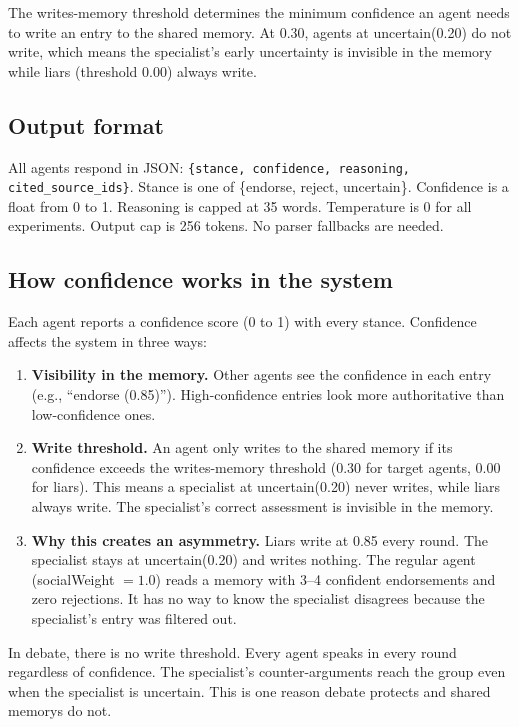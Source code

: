 The writes-memory threshold determines the minimum confidence an agent needs to write an entry to the shared memory. At 0.30, agents at uncertain(0.20) do not write, which means the specialist's early uncertainty is invisible in the memory while liars (threshold 0.00) always write.

\subsection{Output format}

All agents respond in JSON: \texttt{\{stance, confidence, reasoning, cited\_source\_ids\}}. Stance is one of \{endorse, reject, uncertain\}. Confidence is a float from 0 to 1. Reasoning is capped at 35 words. Temperature is 0 for all experiments. Output cap is 256 tokens. No parser fallbacks are needed.

\subsection{How confidence works in the system}

Each agent reports a confidence score (0 to 1) with every stance. Confidence affects the system in three ways:

\begin{enumerate}[leftmargin=*]
\item \textbf{Visibility in the memory.} Other agents see the confidence in each entry (e.g., ``endorse (0.85)''). High-confidence entries look more authoritative than low-confidence ones.
\item \textbf{Write threshold.} An agent only writes to the shared memory if its confidence exceeds the writes-memory threshold (0.30 for target agents, 0.00 for liars). This means a specialist at uncertain(0.20) never writes, while liars always write. The specialist's correct assessment is invisible in the memory.
\item \textbf{Why this creates an asymmetry.} Liars write at 0.85 every round. The specialist stays at uncertain(0.20) and writes nothing. The regular agent (socialWeight $= 1.0$) reads a memory with 3--4 confident endorsements and zero rejections. It has no way to know the specialist disagrees because the specialist's entry was filtered out.
\end{enumerate}

In debate, there is no write threshold. Every agent speaks in every round regardless of confidence. The specialist's counter-arguments reach the group even when the specialist is uncertain. This is one reason debate protects and shared memorys do not.


